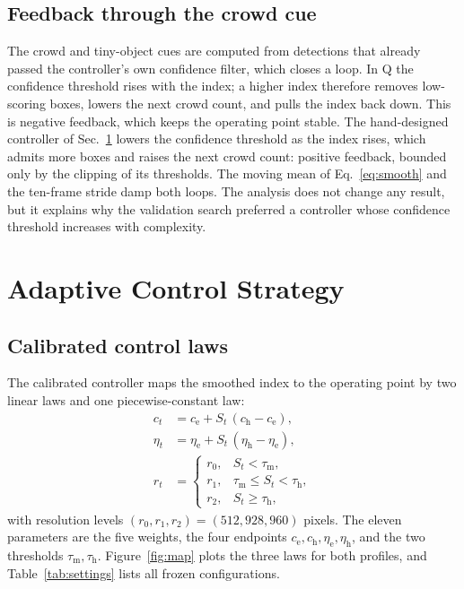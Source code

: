 \documentclass[journal]{new-aiaa}
\begin{document}
\subsection{Feedback through the crowd cue}
The crowd and tiny-object cues are computed from detections that already passed the controller's own confidence filter, which closes a loop. In Q the confidence threshold rises with the index; a higher index therefore removes low-scoring boxes, lowers the next crowd count, and pulls the index back down. This is negative feedback, which keeps the operating point stable. The hand-designed controller of Sec.~\ref{sec:control} lowers the confidence threshold as the index rises, which admits more boxes and raises the next crowd count: positive feedback, bounded only by the clipping of its thresholds. The moving mean of Eq.~\eqref{eq:smooth} and the ten-frame stride damp both loops. The analysis does not change any result, but it explains why the validation search preferred a controller whose confidence threshold increases with complexity.

\section{Adaptive Control Strategy}\label{sec:control}

\subsection{Calibrated control laws}
The calibrated controller maps the smoothed index to the operating point by two linear laws and one piecewise-constant law:
\begin{align}
c_t &= c_{\mathrm{e}} + S_t\,(c_{\mathrm{h}} - c_{\mathrm{e}}), \label{eq:conf}\\
\eta_t &= \eta_{\mathrm{e}} + S_t\,(\eta_{\mathrm{h}} - \eta_{\mathrm{e}}), \label{eq:nms}\\
r_t &= \begin{cases} r_0, & S_t < \tau_{\mathrm{m}},\\ r_1, & \tau_{\mathrm{m}} \le S_t < \tau_{\mathrm{h}},\\ r_2, & S_t \ge \tau_{\mathrm{h}}, \end{cases} \label{eq:res}
\end{align}
with resolution levels $(r_0, r_1, r_2) = (512, 928, 960)$ pixels. The eleven parameters are the five weights, the four endpoints $c_{\mathrm{e}}, c_{\mathrm{h}}, \eta_{\mathrm{e}}, \eta_{\mathrm{h}}$, and the two thresholds $\tau_{\mathrm{m}}, \tau_{\mathrm{h}}$. Figure~\ref{fig:map} plots the three laws for both profiles, and Table~\ref{tab:settings} lists all frozen configurations.
\end{document}
